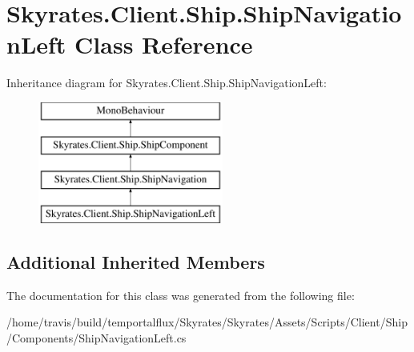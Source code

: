 \hypertarget{class_skyrates_1_1_client_1_1_ship_1_1_ship_navigation_left}{\section{Skyrates.\-Client.\-Ship.\-Ship\-Navigation\-Left Class Reference}
\label{class_skyrates_1_1_client_1_1_ship_1_1_ship_navigation_left}
}
Inheritance diagram for Skyrates.\-Client.\-Ship.\-Ship\-Navigation\-Left\-:\begin{figure}[H]
\begin{center}
\leavevmode
\includegraphics[height=4.000000cm]{class_skyrates_1_1_client_1_1_ship_1_1_ship_navigation_left}
\end{center}
\end{figure}
\subsection*{Additional Inherited Members}


The documentation for this class was generated from the following file\-:\begin{DoxyCompactItemize}
\item 
/home/travis/build/temportalflux/\-Skyrates/\-Skyrates/\-Assets/\-Scripts/\-Client/\-Ship/\-Components/Ship\-Navigation\-Left.\-cs\end{DoxyCompactItemize}
